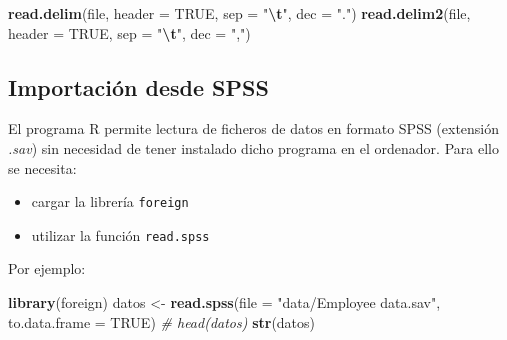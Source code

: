 \documentclass[
]{book}
\newenvironment{Shaded}{\begin{snugshade}}{\end{snugshade}}
\newcommand{\AttributeTok}[1]{\textcolor[rgb]{0.13,0.29,0.53}{#1}}
\newcommand{\CommentTok}[1]{\textcolor[rgb]{0.56,0.35,0.01}{\textit{#1}}}
\newcommand{\ConstantTok}[1]{\textcolor[rgb]{0.56,0.35,0.01}{#1}}
\newcommand{\FunctionTok}[1]{\textcolor[rgb]{0.13,0.29,0.53}{\textbf{#1}}}
\newcommand{\NormalTok}[1]{#1}
\newcommand{\OtherTok}[1]{\textcolor[rgb]{0.56,0.35,0.01}{#1}}
\newcommand{\SpecialCharTok}[1]{\textcolor[rgb]{0.81,0.36,0.00}{\textbf{#1}}}
\newcommand{\StringTok}[1]{\textcolor[rgb]{0.31,0.60,0.02}{#1}}
\begin{document}
\begin{Shaded}
\begin{Highlighting}[]
\FunctionTok{read.delim}\NormalTok{(file, }\AttributeTok{header =} \ConstantTok{TRUE}\NormalTok{, }\AttributeTok{sep =} \StringTok{"}\SpecialCharTok{\textbackslash{}t}\StringTok{"}\NormalTok{, }\AttributeTok{dec =} \StringTok{"."}\NormalTok{)}
\FunctionTok{read.delim2}\NormalTok{(file, }\AttributeTok{header =} \ConstantTok{TRUE}\NormalTok{, }\AttributeTok{sep =} \StringTok{"}\SpecialCharTok{\textbackslash{}t}\StringTok{"}\NormalTok{, }\AttributeTok{dec =} \StringTok{","}\NormalTok{)}
\end{Highlighting}
\end{Shaded}

\subsection{Importación desde SPSS}\label{importaciuxf3n-desde-spss}

El programa R permite lectura de ficheros de datos en formato SPSS (extensión \emph{.sav}) sin necesidad de tener instalado dicho programa en el ordenador. Para ello se necesita:

\begin{itemize}
\item
  cargar la librería \texttt{foreign}
\item
  utilizar la función \texttt{read.spss}
\end{itemize}

Por ejemplo:

\small

\begin{Shaded}
\begin{Highlighting}[]
\FunctionTok{library}\NormalTok{(foreign)}
\NormalTok{datos }\OtherTok{\textless{}{-}} \FunctionTok{read.spss}\NormalTok{(}\AttributeTok{file =} \StringTok{"data/Employee data.sav"}\NormalTok{, }
                   \AttributeTok{to.data.frame =} \ConstantTok{TRUE}\NormalTok{)}
\CommentTok{\# head(datos)}
\FunctionTok{str}\NormalTok{(datos)}
\end{Highlighting}
\end{Shaded}
\end{document}
